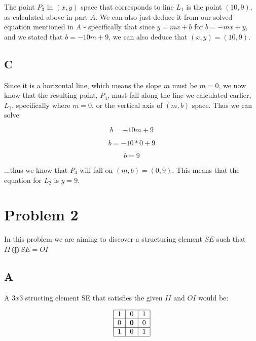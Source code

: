 \documentclass{article}
\begin{document}
The point $P_3$ in $(x,y)$ space that corresponds to line $L_1$ is the point $(10,9)$, as calculated above in part $A$. We can also just deduce it from our solved equation mentioned in $A$ - specifically that since $y=mx+b$ for $b=-mx+y$, and we stated that $b=-10m+9$, we can also deduce that $(x,y)=(10,9)$.

\subsection*{C}

Since it is a horizontal line, which means the slope $m$ must be $m=0$, we now know that the resulting point, $P_4$, must fall along the line we calculated earlier, $L_1$, specifically where $m=0$, or the vertical axis of $(m,b)$ space. Thus we can solve:

\begin{equation}
    b = -10m + 9
\end{equation}

\begin{equation}
    b = -10*0 + 9
\end{equation}

\begin{equation}
    b = 9
\end{equation}

\noindent ...thus we know that $P_4$ will fall on $(m,b)=(0,9)$. This means that the equation for $L_2$ is $y=9$.

\section*{Problem 2}

In this problem we are aiming to discover a structuring element $SE$ such that $II\bigoplus SE =OI$

\subsection*{A}

A $3x3$ structing element SE that satisfies the given $II$ and $OI$ would be:

\begin{equation}
    \begin{tabular}{ | c | c | c | }
        \hline
        1 & 0 & 1 \\
        \hline
        0 & \textbf{0} & 0 \\
        \hline
        1 & 0 & 1 \\
        \hline
    \end{tabular}
\end{equation}
\end{document}
